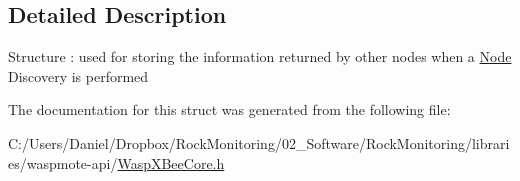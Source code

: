 \subsection{Detailed Description}
Structure \+: used for storing the information returned by other nodes when a \hyperlink{struct_node}{Node} Discovery is performed 

The documentation for this struct was generated from the following file\+:\begin{DoxyCompactItemize}
\item 
C\+:/\+Users/\+Daniel/\+Dropbox/\+Rock\+Monitoring/02\+\_\+\+Software/\+Rock\+Monitoring/libraries/waspmote-\/api/\hyperlink{_wasp_x_bee_core_8h}{Wasp\+X\+Bee\+Core.\+h}\end{DoxyCompactItemize}
